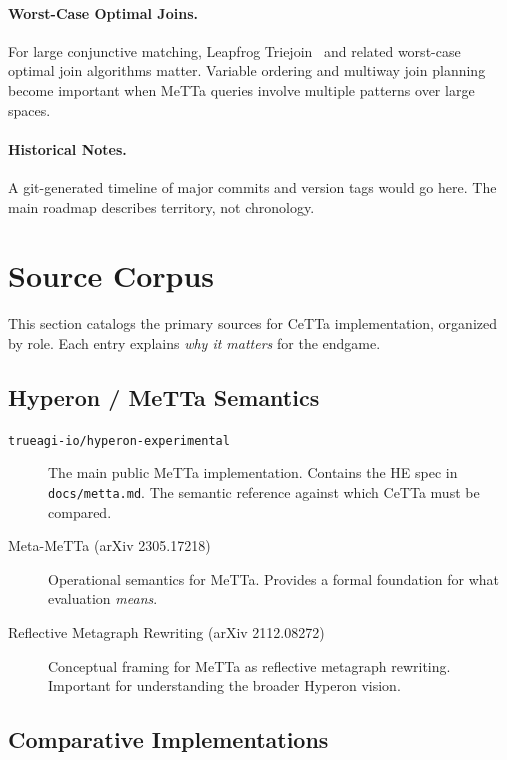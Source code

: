 \documentclass[11pt]{article}
\newcommand{\code}[1]{\texttt{#1}}
\newcommand{\HE}{\textup{HE}}
\newcommand{\CeTTa}{\textup{CeTTa}}
\begin{document}
\paragraph{Worst-Case Optimal Joins.}
For large conjunctive matching, Leapfrog Triejoin~\cite{Veldhuizen2014}
and related worst-case optimal join algorithms matter.  Variable ordering
and multiway join planning become important when MeTTa queries involve
multiple patterns over large spaces.

\paragraph{Historical Notes.}
A git-generated timeline of major commits and version tags would go here.
The main roadmap describes territory, not chronology.

\section{Source Corpus}
\label{sec:sources}

This section catalogs the primary sources for \CeTTa{} implementation,
organized by role.  Each entry explains \emph{why it matters} for the
endgame.

\subsection{Hyperon / MeTTa Semantics}

\begin{description}
\item[\code{trueagi-io/hyperon-experimental}]
  The main public MeTTa implementation.  Contains the \HE{} spec in
  \code{docs/metta.md}.  The semantic reference against which \CeTTa{}
  must be compared.

\item[Meta-MeTTa (arXiv 2305.17218)]
  Operational semantics for MeTTa.  Provides a formal foundation for
  what evaluation \emph{means}.

\item[Reflective Metagraph Rewriting (arXiv 2112.08272)]
  Conceptual framing for MeTTa as reflective metagraph rewriting.
  Important for understanding the broader Hyperon vision.
\end{description}

\subsection{Comparative Implementations}
\end{document}
